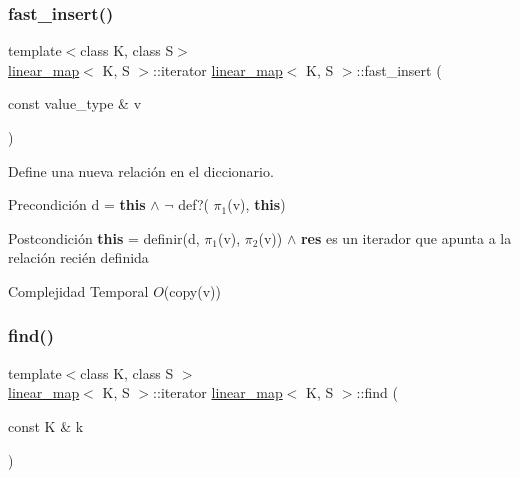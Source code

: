 \subsubsection{\texorpdfstring{fast\+\_\+insert()}{fast\_insert()}}
{\footnotesize\ttfamily template$<$class K, class S$>$ \\
\mbox{\hyperlink{classlinear__map}{linear\+\_\+map}}$<$ K, S $>$\+::iterator \mbox{\hyperlink{classlinear__map}{linear\+\_\+map}}$<$ K, S $>$\+::fast\+\_\+insert (\begin{DoxyParamCaption}\item[{const value\+\_\+type \&}]{v }\end{DoxyParamCaption})}



Define una nueva relación en el diccionario. 

\begin{DoxyPrecond}{Precondición}
d = {\bfseries this} $\land$ $\lnot$ def?( $\pi_1$(v), {\bfseries this}) 
\end{DoxyPrecond}
\begin{DoxyPostcond}{Postcondición}
{\bfseries this} = definir(d, $\pi_1$(v), $\pi_2$(v)) $\land$ {\bfseries res} es un iterador que apunta a la relación recién definida
\end{DoxyPostcond}

\begin{DoxyDescription}
\item[Complejidad Temporal]$O$(copy(v))
\end{DoxyDescription}\mbox{\label{classlinear__map_a227924393723570ac58f79fd194aac61}} 
\subsubsection{\texorpdfstring{find()}{find()}\hspace{0.1cm}{\footnotesize\ttfamily [1/2]}}
{\footnotesize\ttfamily template$<$class K, class S $>$ \\
\mbox{\hyperlink{classlinear__map}{linear\+\_\+map}}$<$ K, S $>$\+::iterator \mbox{\hyperlink{classlinear__map}{linear\+\_\+map}}$<$ K, S $>$\+::find (\begin{DoxyParamCaption}\item[{const K \&}]{k }\end{DoxyParamCaption})}



